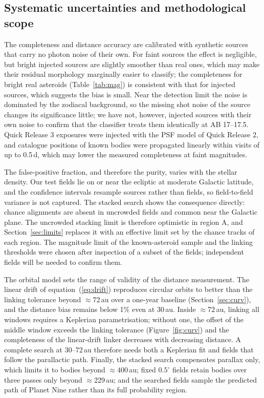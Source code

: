 \documentclass[twocolumn,linenumbers,anonymous]{aastex702}
\begin{document}
\subsection{Systematic uncertainties and methodological scope}\label{sec:scope}
The completeness and distance accuracy are calibrated with synthetic sources that carry no photon noise of their own. For faint sources the effect is negligible, but bright injected sources are slightly smoother than real ones, which may make their residual morphology marginally easier to classify; the completeness for bright real asteroids (Table~\ref{tab:mag}) is consistent with that for injected sources, which suggests the bias is small. Near the detection limit the noise is dominated by the zodiacal background, so the missing shot noise of the source changes its significance little; we have not, however, injected sources with their own noise to confirm that the classifier treats them identically at AB 17--17.5. Quick Release 3 exposures were injected with the PSF model of Quick Release 2, and catalogue positions of known bodies were propagated linearly within visits of up to 0.5\,d, which may lower the measured completeness at faint magnitudes.

The false-positive fraction, and therefore the purity, varies with the stellar density. Our test fields lie on or near the ecliptic at moderate Galactic latitude, and the confidence intervals resample sources rather than fields, so field-to-field variance is not captured. The stacked search shows the consequence directly: chance alignments are absent in uncrowded fields and common near the Galactic plane. The uncrowded stacking limit is therefore optimistic in region A, and Section~\ref{sec:limits} replaces it with an effective limit set by the chance tracks of each region. The magnitude limit of the known-asteroid sample and the linking thresholds were chosen after inspection of a subset of the fields; independent fields will be needed to confirm them.

The orbital model sets the range of validity of the distance measurement. The linear drift of equation~(\ref{eq:drift}) reproduces circular orbits to better than the linking tolerance beyond $\approx$72\,au over a one-year baseline (Section~\ref{sec:curv}), and the distance bias remains below 1\% even at 30\,au. Inside $\approx$72\,au, linking all windows requires a Keplerian parametrisation; without one, the offset of the middle window exceeds the linking tolerance (Figure~\ref{fig:curv}) and the completeness of the linear-drift linker decreases with decreasing distance. A complete search at 30--72\,au therefore needs both a Keplerian fit and fields that follow the parallactic path. Finally, the stacked search compensates parallax only, which limits it to bodies beyond $\approx 400$\,au; fixed $0.5^\circ$ fields retain bodies over three passes only beyond $\approx$229\,au; and the searched fields sample the predicted path of Planet Nine rather than its full probability region.
\end{document}
